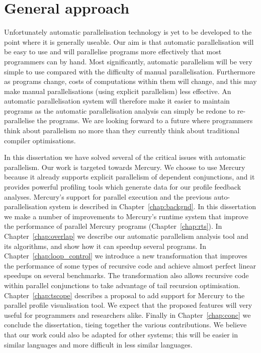 

\section{General approach}
\label{sec:intro_general_approach}

Unfortunately automatic parallelisation technology is yet to be developed to the
point where it is generally useable.
Our aim is that automatic parallelisation will be easy to use and
will parallelise programs more effectively that most programmers can by
hand.
Most significantly,
automatic parallelism will be very simple to use compared with the
difficulty of manual parallelisation.
Furthermore as programs change,
costs of computations within them will change,
and this may make manual parallelisations (using explicit parallelism) less
effective.
An automatic parallelisation system will therefore make it easier to
maintain programs as the automatic parallelisation analysis can simply be
redone to re-parallelise the programs.
We are looking forward to a future where programmers think about
parallelism no more than they currently think about traditional compiler
optimisations.

In this dissertation we have solved several of the critical issues with
automatic parallelism.
Our work is targeted towards Mercury.
We choose to use Mercury because
it already supports explicit parallelism of dependent conjunctions,
and it provides powerful profiling tools which generate data for our profile
feedback analyses.
Mercury's support for parallel execution and the previous
auto-parallelisation system \citep{bone:2008:hons} is described in
Chapter~\ref{chap:backgnd}.
In this dissertation we make a number of improvements to Mercury's runtime
system that improve the performance of parallel Mercury programs
(Chapter~\ref{chap:rts}).
In Chapter~\ref{chap:overlap} we describe our
automatic parallelism analysis tool and its algorithms,
and show how it can speedup several programs.
In Chapter~\ref{chap:loop_control} we introduce a new transformation that
improves the performance of 
some types of recursive code and achieve almost perfect linear speedups on
several benchmarks.
The transformation also allows recursive code within parallel conjunctions
to take advantage of tail recursion optimisation.
Chapter~\ref{chap:tscope} describes a proposal to add support for Mercury to
the \tscope parallel profile visualisation tool.
We expect that the proposed features will very useful for programmers and
researchers alike.
Finally in Chapter~\ref{chap:conc} we conclude the dissertation,
tieing together the various contributions.
We believe that our work could also be adapted for other systems;
this will be easier in similar languages and more difficult in less similar
languages.

